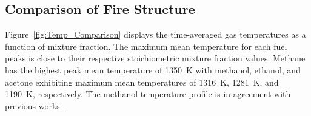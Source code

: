 \documentclass[preprint,review,12pt]{elsarticle}
\begin{document}
\begin{table}[!t]
\caption[List of measurements and thermochemical properties of fuels]{List of measurements and thermochemical properties of fuels burning in well-ventilated round pool fires}
\label{tab:Pool_Fire_Parameters_Table}
\footnotesize
 \centering
{}
\end{table}

\subsection{Comparison of Fire Structure}
\label{ssec:Fuel_comp}

Figure~\ref{fig:Temp_Comparison} displays the time-averaged gas temperatures as a function of mixture fraction. The maximum mean temperature for each fuel peaks is close to their respective stoichiometric mixture fraction values. Methane has the highest peak mean temperature of 1350~K with methanol, ethanol, and acetone exhibiting maximum mean temperatures of 1316~K, 1281~K, and 1190~K, respectively. The methanol temperature profile is in agreement with previous works~\cite{Wang2019}.
\end{document}

